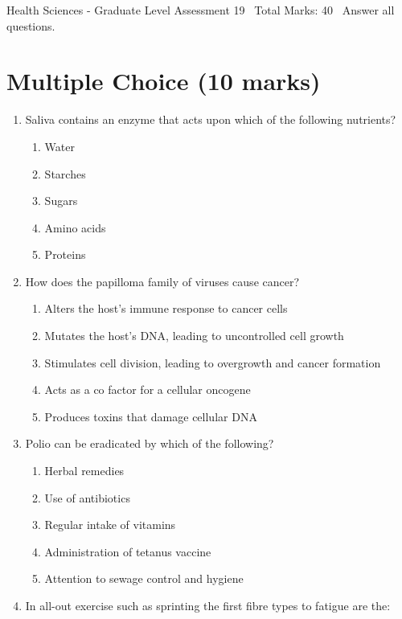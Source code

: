 \documentclass[12pt]{article}
\begin{document}
\begin{center}
Health Sciences - Graduate Level Assessment 19 \
Total Marks: 40 \
Answer all questions.
\end{center}

\section*{Multiple Choice (10 marks)}
\begin{enumerate}[label=\arabic*.]
\item Saliva contains an enzyme that acts upon which of the following nutrients?
\begin{enumerate}[label=(\alph*)]
    \item Water
    \item Starches
    \item Sugars
    \item Amino acids
    \item Proteins
\end{enumerate}
\item How does the papilloma family of viruses cause cancer?
\begin{enumerate}[label=(\alph*)]
    \item Alters the host's immune response to cancer cells
    \item Mutates the host's DNA, leading to uncontrolled cell growth
    \item Stimulates cell division, leading to overgrowth and cancer formation
    \item Acts as a co factor for a cellular oncogene
    \item Produces toxins that damage cellular DNA
\end{enumerate}
\item Polio can be eradicated by which of the following?
\begin{enumerate}[label=(\alph*)]
    \item Herbal remedies
    \item Use of antibiotics
    \item Regular intake of vitamins
    \item Administration of tetanus vaccine
    \item Attention to sewage control and hygiene
\end{enumerate}
\item In all-out exercise such as sprinting the first fibre types to fatigue are the:
\begin{enumerate}[label=(\alph*)]

\end{enumerate}
\end{enumerate}
\end{document}
